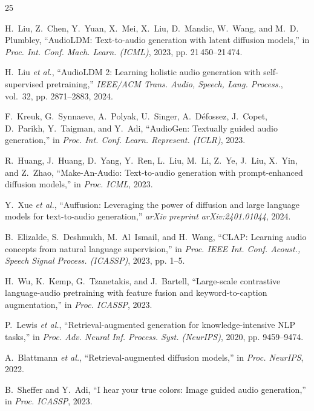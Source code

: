 \documentclass[journal]{IEEEtran}
\begin{document}
\begin{thebibliography}{25}

H.~Liu, Z.~Chen, Y.~Yuan, X.~Mei, X.~Liu, D.~Mandic, W.~Wang, and
M.~D. Plumbley, ``AudioLDM: Text-to-audio generation with latent
diffusion models,'' in \emph{Proc. Int. Conf. Mach. Learn. (ICML)},
2023, pp. 21\,450--21\,474.

H.~Liu \emph{et al.}, ``AudioLDM 2: Learning holistic audio generation
with self-supervised pretraining,'' \emph{IEEE/ACM Trans. Audio,
Speech, Lang. Process.}, vol.~32, pp. 2871--2883, 2024.

F.~Kreuk, G.~Synnaeve, A.~Polyak, U.~Singer, A.~D\'{e}fossez,
J.~Copet, D.~Parikh, Y.~Taigman, and Y.~Adi, ``AudioGen:
Textually guided audio generation,'' in \emph{Proc. Int. Conf. Learn.
Represent. (ICLR)}, 2023.

R.~Huang, J.~Huang, D.~Yang, Y.~Ren, L.~Liu, M.~Li, Z.~Ye, J.~Liu,
X.~Yin, and Z.~Zhao, ``Make-An-Audio: Text-to-audio generation with
prompt-enhanced diffusion models,'' in \emph{Proc. ICML}, 2023.

Y.~Xue \emph{et al.}, ``Auffusion: Leveraging the power of diffusion
and large language models for text-to-audio generation,''
\emph{arXiv preprint arXiv:2401.01044}, 2024.

B.~Elizalde, S.~Deshmukh, M.~Al~Ismail, and H.~Wang, ``CLAP: Learning
audio concepts from natural language supervision,'' in \emph{Proc. IEEE
Int. Conf. Acoust., Speech Signal Process. (ICASSP)}, 2023, pp. 1--5.

H.~Wu, K.~Kemp, G.~Tzanetakis, and J.~Bartell, ``Large-scale
contrastive language-audio pretraining with feature fusion and
keyword-to-caption augmentation,'' in \emph{Proc. ICASSP}, 2023.

P.~Lewis \emph{et al.}, ``Retrieval-augmented generation for
knowledge-intensive NLP tasks,'' in \emph{Proc. Adv. Neural Inf.
Process. Syst. (NeurIPS)}, 2020, pp. 9459--9474.

A.~Blattmann \emph{et al.}, ``Retrieval-augmented diffusion models,''
in \emph{Proc. NeurIPS}, 2022.

B.~Sheffer and Y.~Adi, ``I hear your true colors: Image guided audio
generation,'' in \emph{Proc. ICASSP}, 2023.


\end{thebibliography}
\end{document}
